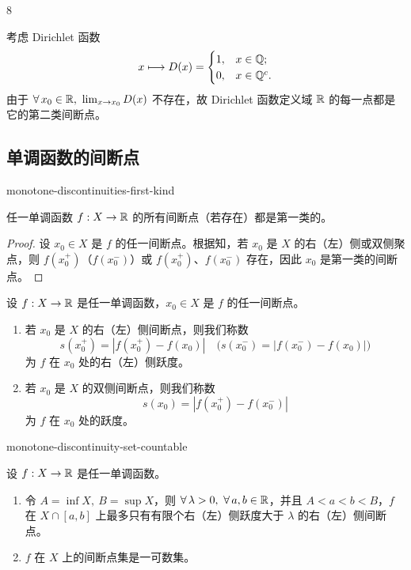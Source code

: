 \begin{sourceexample}{8}

	考虑 Dirichlet 函数
	\[
	x\longmapsto D(x)=\begin{cases} 1, & x\in\mathbb{Q}; \\ 0, & x\in\mathbb{Q}^c. \end{cases}
	\]
	由于 \(\forall\,x_0\in\R,\ \lim_{x\to x_0}D(x)\) 不存在，故 Dirichlet 函数定义域 \(\mathbb{R}\) 的每一点都是它的第二类间断点。

\end{sourceexample}

\subsection{单调函数的间断点}

\begin{mythm}{}{monotone-discontinuities-first-kind}

	任一单调函数 \(f:X\to\mathbb{R}\) 的所有间断点（若存在）都是第一类的。

\end{mythm}

\begin{proof}

	设 \(x_0\in X\) 是 \(f\) 的任一间断点。根据知，若 \(x_0\) 是 \(X\) 的右（左）侧或双侧聚点，则 \(f(x_0^+)\)（\(f(x_0^-)\)）或 \(f(x_0^+)\)、\(f(x_0^-)\) 存在，因此 \(x_0\) 是第一类的间断点。

\end{proof}

\begin{mydef*}{}

	设 \(f:X\to\mathbb{R}\) 是任一单调函数，\(x_0\in X\) 是 \(f\) 的任一间断点。

	\begin{enumerate}[label=\arabic*)]
		\item 若 \(x_0\) 是 \(X\) 的右（左）侧间断点，则我们称数
		\[
		s(x_0^+)=|f(x_0^+)-f(x_0)|\quad \bigl(s(x_0^-)=|f(x_0^-)-f(x_0)|\bigr)
		\]
		为 \(f\) 在 \(x_0\) 处的右（左）侧跃度。

		\item 若 \(x_0\) 是 \(X\) 的双侧间断点，则我们称数
		\[
		s(x_0)=|f(x_0^+)-f(x_0^-)|
		\]
		为 \(f\) 在 \(x_0\) 处的跃度。
	\end{enumerate}

\end{mydef*}

\begin{mythm}{}{monotone-discontinuity-set-countable}

	设 \(f:X\to\mathbb{R}\) 是任一单调函数。

	\begin{enumerate}[label=\arabic*)]
		\item 令 \(A=\inf X,\ B=\sup X\)，则 \(\forall\,\lambda>0,\ \forall\,a,b\in\R\)，并且 \(A<a<b<B\)，\(f\) 在 \(X\cap[a,b]\) 上最多只有有限个右（左）侧跃度大于 \(\lambda\) 的右（左）侧间断点。

		\item \(f\) 在 \(X\) 上的间断点集是一可数集。
	\end{enumerate}

\end{mythm}


